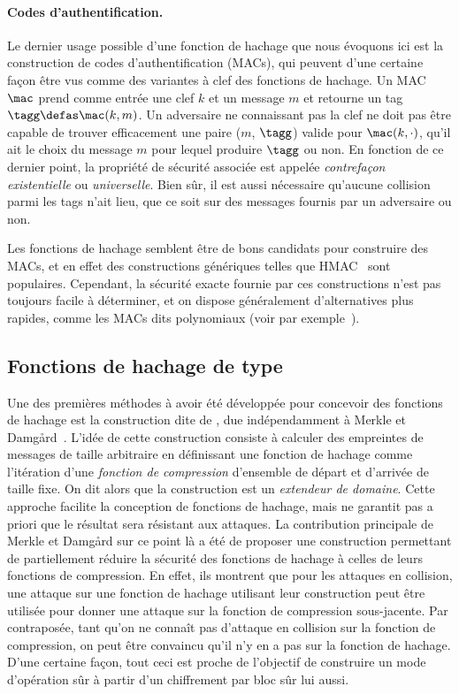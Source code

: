 \paragraph{Codes d'authentification.}
Le dernier usage possible d'une fonction de hachage que nous évoquons ici est la construction de codes d'authentification (MACs),
qui peuvent d'une certaine façon être vus comme des variantes à clef des fonctions de hachage.
Un MAC $\mac$ prend comme entrée une clef $k$ et un message $m$ et retourne un tag
$\tagg \defas \mac(k, m)$.
Un adversaire ne connaissant pas la clef ne doit pas être capable de trouver efficacement une paire ($m$, $\tagg$) valide pour
$\mac(k, \cdot)$, qu'il ait le choix du message $m$ pour lequel produire $\tagg$ ou non.
En fonction de ce dernier point, la propriété de sécurité associée est appelée \emph{contrefaçon existentielle} ou \emph{universelle}.
Bien sûr, il est aussi nécessaire qu'aucune collision parmi les tags n'ait lieu, que ce soit sur des messages fournis par un adversaire ou non.

Les fonctions de hachage semblent être de bons candidats pour construire des MACs, et en effet des constructions génériques telles que
HMAC~\cite{DBLP:conf/crypto/BellareCK96} sont populaires. Cependant, la sécurité exacte fournie par ces constructions n'est pas toujours facile à déterminer,
et on dispose généralement d'alternatives plus rapides, comme les MACs dits polynomiaux
(voir par exemple~\cite{DBLP:conf/crypto/BlackHKKR99}).

\subsection{Fonctions de hachage de type \merkdam}
\label{sec:fmd}

Une des premières méthodes à avoir été développée pour concevoir des fonctions de hachage est la construction dite de \merkdam,
due indépendamment à Merkle et Damg\aa rd~\cite{DBLP:conf/crypto/Merkle89a,DBLP:conf/crypto/Damgard89a}.
L'idée de cette construction consiste à calculer des empreintes de messages de taille arbitraire en définissant
une fonction de hachage comme l'itération d'une \emph{fonction de compression} d'ensemble de départ et d'arrivée de
taille fixe. On dit alors que la construction est un \emph{extendeur de domaine}.
Cette approche facilite la conception de fonctions de hachage, mais ne garantit pas a priori que le résultat sera résistant aux attaques.
La contribution principale de Merkle et Damg\aa rd sur ce point là a été de proposer une construction permettant de partiellement
réduire la sécurité des fonctions de hachage à celles de leurs fonctions de compression.
En effet, ils montrent que
pour les attaques en collision, une attaque sur une fonction de hachage utilisant leur construction peut être utilisée pour donner une attaque sur la fonction
de compression sous-jacente. Par contraposée, tant qu'on ne connaît pas d'attaque en collision sur la fonction de compression, on peut être convaincu
qu'il n'y en a pas sur la fonction de hachage. D'une certaine façon, tout ceci est proche de l'objectif de construire un mode d'opération sûr
à partir d'un chiffrement par bloc sûr lui aussi.

